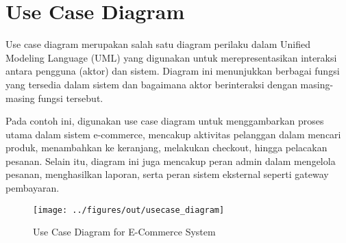 \section{Use Case Diagram}

Use case diagram merupakan salah satu diagram perilaku dalam Unified Modeling Language (UML) yang digunakan untuk merepresentasikan interaksi antara pengguna (aktor) dan sistem. Diagram ini menunjukkan berbagai fungsi yang tersedia dalam sistem dan bagaimana aktor berinteraksi dengan masing-masing fungsi tersebut. 

Pada contoh ini, digunakan use case diagram untuk menggambarkan proses utama dalam sistem e-commerce, mencakup aktivitas pelanggan dalam mencari produk, menambahkan ke keranjang, melakukan checkout, hingga pelacakan pesanan. Selain itu, diagram ini juga mencakup peran admin dalam mengelola pesanan, menghasilkan laporan, serta peran sistem eksternal seperti gateway pembayaran.

\begin{figure}[ht]
	\centering
	\texttt{[image: ../figures/out/usecase\_diagram]}
	\caption{Use Case Diagram for E-Commerce System}
	\label{fig:usecase_diagram}
\end{figure}

